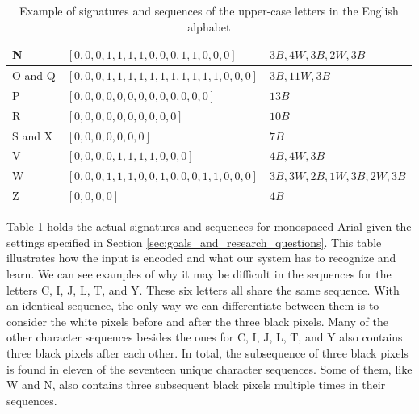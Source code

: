 \begin{table}[H]
\begin{tabular}{|l|l|l|}
        N                     & \([0, 0, 0, 1, 1, 1, 1, 0, 0, 0, 1, 1, 0, 0, 0]\)       & \(3B, 4W, 3B, 2W, 3B\)         \\ \hline
        O and Q               & \([0, 0, 0, 1, 1, 1, 1, 1, 1, 1, 1, 1, 1, 1, 0, 0, 0]\) & \(3B, 11W, 3B\)                \\ \hline
        P                     & \([0, 0, 0, 0, 0, 0, 0, 0, 0, 0, 0, 0, 0]\)             & \(13B\)                        \\ \hline
        R                     & \([0, 0, 0, 0, 0, 0, 0, 0, 0, 0]\)                      & \(10B\)                        \\ \hline
        S and X               & \([0, 0, 0, 0, 0, 0, 0]\)                               & \(7B\)                         \\ \hline
        V                     & \([0, 0, 0, 0, 1, 1, 1, 1, 0, 0, 0]\)                   & \(4B, 4W, 3B\)                 \\ \hline
        W                     & \([0, 0, 0, 1, 1, 1, 0, 0, 1, 0, 0, 0, 1, 1, 0, 0, 0]\) & \(3B, 3W, 2B, 1W, 3B, 2W, 3B\) \\ \hline
        Z                     & \([0, 0, 0, 0]\)                                        & \(4B\)                         \\ \hline
    \end{tabular}
    \captionsetup{justification=centering}
    \caption{Example of signatures and sequences of the upper-case letters in the English alphabet}
    \label{table:signature_sequence_example}
\end{table}

Table \ref{table:signature_sequence_example} holds the actual signatures and sequences for monospaced Arial given the settings specified in Section \ref{sec:goals_and_research_questions}. This table illustrates how the input is encoded and what our system has to recognize and learn. We can see examples of why it may be difficult in the sequences for the letters C, I, J, L, T, and Y. These six letters all share the same sequence. With an identical sequence, the only way we can differentiate between them is to consider the white pixels before and after the three black pixels. Many of the other character sequences besides the ones for C, I, J, L, T, and Y also contains three black pixels after each other. In total, the subsequence of three black pixels is found in eleven of the seventeen unique character sequences. Some of them, like W and N, also contains three subsequent black pixels multiple times in their sequences. 

